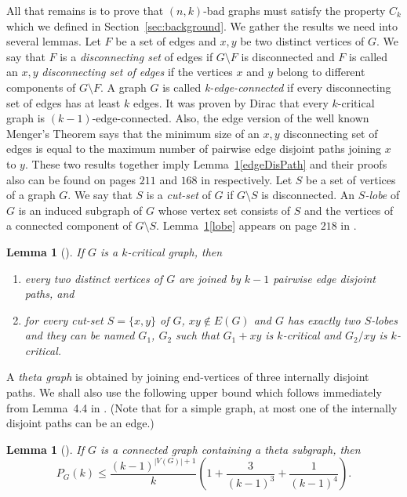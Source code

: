 \documentclass[11pt]{article}
\theoremstyle{plain}
\newtheorem{lemma}[theorem]{Lemma}
\theoremstyle{definition}
\theoremstyle{remark}
\begin{document}
All that remains is to prove that $(n,k)$-bad graphs must satisfy the property $C_k$ which we defined in Section~\ref{sec:background}. We gather the results we need into several lemmas. Let $F$ be a set of edges  and $x,y$ be two distinct vertices  of $G$. We say that $F$ is a {\it disconnecting set} of edges if $G\setminus F$ is disconnected and $F$ is called an $x,y$ {\it disconnecting set of edges} if the vertices $x$ and $y$ belong to different components of $G\setminus F$. A graph $G$ is called {\it k-edge-connected} if every disconnecting set of edges has at least $k$ edges. It was proven by Dirac \cite{dirac} that every $k$-critical graph is $(k-1)$-edge-connected. Also, the edge version of the well known Menger's Theorem \cite{menger} says that the minimum size of an $x,y$ disconnecting set of edges is equal to the maximum number of pairwise edge disjoint paths joining $x$ to $y$. These two results together imply Lemma~\ref{CritProp}\ref{edgeDisPath} and their proofs also can be found  on pages $211$ and $168$ in \cite{westbook} respectively. Let $S$ be a set of vertices of a graph $G$. We say that $S$ is a {\it cut-set} of $G$ if $G\setminus S$ is disconnected.  An {\it $S$-lobe} of $G$ is an induced subgraph of $G$ whose vertex set consists of $S$ and the vertices of a connected component of $G\setminus S$. Lemma~\ref{CritProp}\ref{lobe} appears on page $218$ in \cite{westbook}.

\begin{lemma}[\cite{westbook}]\label{CritProp}
If $G$ is a $k$-critical graph, then
\begin{enumerate}[label={(\roman*)},itemindent=1em]
    \item every two distinct vertices of $G$ are joined by $k-1$ pairwise edge disjoint paths, and \label{edgeDisPath} 
    \item for every cut-set $S=\{x,y\}$ of $G$, $xy\notin E(G)$ and $G$ has exactly two $S$-lobes and they can be named $G_1$, $G_2$ such that $G_1+xy$ is $k$-critical and $G_2/xy$ is $k$-critical. \label{lobe}
 \end{enumerate}
\end{lemma}

A {\it theta graph} is obtained by joining end-vertices of three internally disjoint paths. We shall also use the following upper bound which follows immediately from Lemma~4.4 in \cite{ereyDM}. (Note that for a simple graph, at most one of the internally disjoint paths can be an edge.)

\begin{lemma}[\cite{ereyDM}]\label{theta}  If $G$ is a connected graph containing a theta subgraph, then 
$$P_G(k)\leq \frac{(k-1)^{|V(G)|+1}}{k}\left(1+\frac{3}{(k-1)^3}+\frac{1}{(k-1)^4}\right).$$
\end{lemma}
\end{document}
